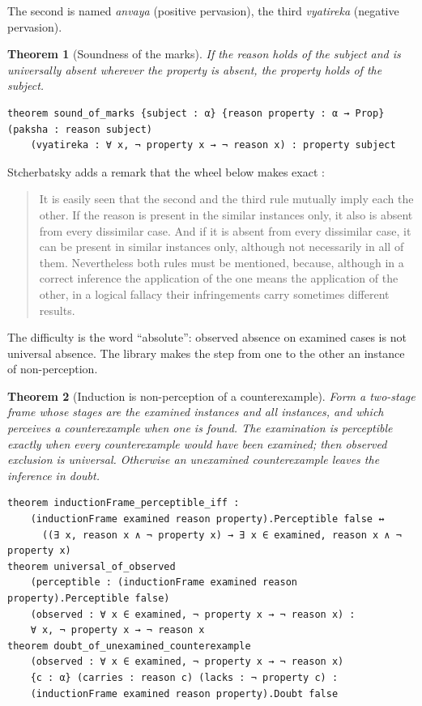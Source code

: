 \documentclass[11pt]{article}
\theoremstyle{plain}
\newtheorem{theorem}{Theorem}[section]
\theoremstyle{definition}
\begin{document}
\noindent The second is named \emph{anvaya} (positive pervasion), the third \emph{vyatireka}
(negative pervasion).

\begin{theorem}[Soundness of the marks]
If the reason holds of the subject and is universally absent wherever the property is
absent, the property holds of the subject.
\end{theorem}

\begin{lstlisting}
theorem sound_of_marks {subject : α} {reason property : α → Prop} (paksha : reason subject)
    (vyatireka : ∀ x, ¬ property x → ¬ reason x) : property subject
\end{lstlisting}

\noindent Stcherbatsky adds a remark that the wheel below makes exact
\cite[p.~244]{Stcherbatsky1932}:

\begin{quote}
It is easily seen that the second and the third rule mutually imply each the other. If the
reason is present in the similar instances only, it also is absent from every dissimilar case.
And if it is absent from every dissimilar case, it can be present in similar instances only,
although not necessarily in all of them. Nevertheless both rules must be mentioned, because,
although in a correct inference the application of the one means the application of the
other, in a logical fallacy their infringements carry sometimes different results.
\end{quote}

\noindent The difficulty is the word ``absolute'': observed absence on examined cases is not
universal absence. The library makes the step from one to the other an instance of
non-perception.

\begin{theorem}[Induction is non-perception of a counterexample]
Form a two-stage frame whose stages are the examined instances and all instances, and which
perceives a counterexample when one is found. The examination is perceptible exactly when
every counterexample would have been examined; then observed exclusion is universal.
Otherwise an unexamined counterexample leaves the inference in doubt.
\end{theorem}

\begin{lstlisting}
theorem inductionFrame_perceptible_iff :
    (inductionFrame examined reason property).Perceptible false ↔
      ((∃ x, reason x ∧ ¬ property x) → ∃ x ∈ examined, reason x ∧ ¬ property x)
theorem universal_of_observed
    (perceptible : (inductionFrame examined reason property).Perceptible false)
    (observed : ∀ x ∈ examined, ¬ property x → ¬ reason x) :
    ∀ x, ¬ property x → ¬ reason x
theorem doubt_of_unexamined_counterexample
    (observed : ∀ x ∈ examined, ¬ property x → ¬ reason x)
    {c : α} (carries : reason c) (lacks : ¬ property c) :
    (inductionFrame examined reason property).Doubt false
\end{lstlisting}
\end{document}
